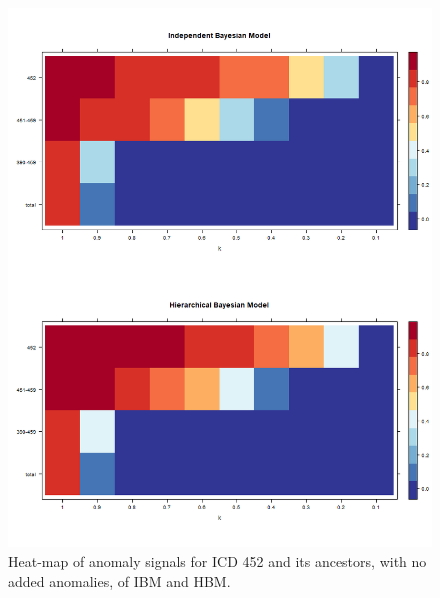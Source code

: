 \newpage%

\begin{figure}[!h]
	\centering
	\includegraphics[width=1\linewidth]{../../R-codes/JAGS/plots/mimic/heat452}
	\caption{Heat-map of anomaly signals for ICD 452 and its ancestors, with no added anomalies, of IBM and HBM.}
	\label{fig:heat452}
\end{figure}

\newpage

